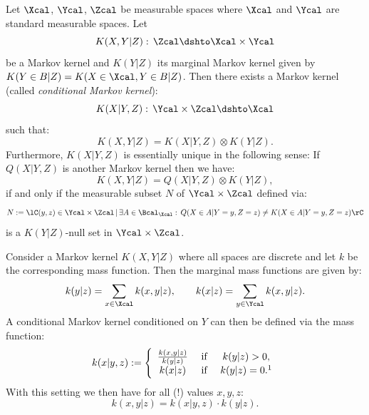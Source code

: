\begin{DefThm}
    \label{thm-regular-conditional-Markov-kernel}
    Let $\Xcal$, $\Ycal$, $\Zcal$ be measurable spaces where $\Xcal$ and $\Ycal$ are standard measurable spaces.
    Let 
    \[ K(X,Y|Z):\, \Zcal \dshto \Xcal \times \Ycal\]
    be a Markov kernel and $K(Y|Z)$ its marginal Markov kernel given by $K(Y\in B|Z) = K(X \in \Xcal, Y \in B|Z)$.
    Then there exists a Markov kernel (called \emph{conditional Markov kernel}):
    \[ K(X|Y,Z):\, \Ycal \times \Zcal \dshto \Xcal\]
    such that:
    \[   K(X,Y|Z) = K(X|Y,Z) \otimes K(Y|Z).\]
    Furthermore, $K(X|Y,Z)$ is essentially unique in the following sense:
    If $Q(X|Y,Z)$ is another Markov kernel 
    then we have:
    \[ K(X,Y|Z) = Q(X|Y,Z) \otimes K(Y|Z),\]
    if and only if the measurable subset $N$ of $\Ycal \times \Zcal$ defined via:
    \[ N:= \lC (y,z) \in \Ycal \times \Zcal \,|\, \exists A \in \Bcal_\Xcal:\, Q(X \in A|Y=y,Z=z) \neq K(X \in A|Y=y,Z=z)\rC  \]
    is a $K(Y|Z)$-null set in $\Ycal \times \Zcal$.
\end{DefThm}

\begin{Eg}
    Consider a Markov kernel $K(X,Y|Z)$ where all spaces are discrete and let $k$ be the corresponding mass function.
    Then the marginal mass functions are given by:
    \[ k(y|z) = \sum_{x \in \Xcal} k(x,y|z), \qquad k(x|z) = \sum_{y \in \Ycal} k(x,y|z). \]
    A conditional Markov kernel conditioned on $Y$ can then be defined via the mass function:
    \[
        k(x|y,z) := \left\{
            \begin{array}{cccc}
                \frac{k(x,y|z)}{k(y|z)} & \text{ if } & k(y|z) >0,\\
                k(x|z)& \text{ if } & k(y|z) = 0.\footnotemark
            \end{array}\right.
    \]
    With this setting we then have for all (!) values $x,y,z$:
    \[ k(x,y|z) = k(x|y,z) \cdot k(y|z). \]
\end{Eg}

